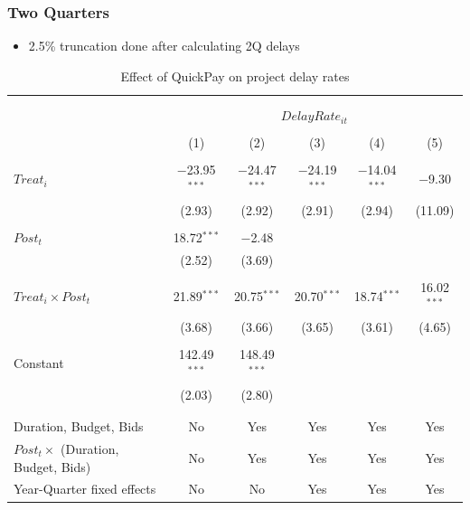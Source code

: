\documentclass[
]{article}
\providecommand{\tightlist}{%
  \setlength{\itemsep}{0pt}\setlength{\parskip}{0pt}}
\begin{document}
\hypertarget{two-quarters-5}{%
\subsubsection{Two Quarters}\label{two-quarters-5}}

\begin{itemize}
\tightlist
\item
  2.5\% truncation done after calculating 2Q delays
\end{itemize}

\begin{table}[H] \centering 
  \caption{Effect of QuickPay on project delay rates} 
  \label{} 
\small 
\begin{tabular}{@{\extracolsep{-2pt}}lccccc} 
\\[-1.8ex]\hline 
\hline \\[-1.8ex] 
\\[-1.8ex] & \multicolumn{5}{c}{$DelayRate_{it}$} \\ 
\\[-1.8ex] & (1) & (2) & (3) & (4) & (5)\\ 
\hline \\[-1.8ex] 
 $Treat_i$ & $-$23.95$^{***}$ & $-$24.47$^{***}$ & $-$24.19$^{***}$ & $-$14.04$^{***}$ & $-$9.30 \\ 
  & (2.93) & (2.92) & (2.91) & (2.94) & (11.09) \\ 
  & & & & & \\ 
 $Post_t$ & 18.72$^{***}$ & $-$2.48 &  &  &  \\ 
  & (2.52) & (3.69) &  &  &  \\ 
  & & & & & \\ 
 $Treat_i \times Post_t$ & 21.89$^{***}$ & 20.75$^{***}$ & 20.70$^{***}$ & 18.74$^{***}$ & 16.02$^{***}$ \\ 
  & (3.68) & (3.66) & (3.65) & (3.61) & (4.65) \\ 
  & & & & & \\ 
 Constant & 142.49$^{***}$ & 148.49$^{***}$ &  &  &  \\ 
  & (2.03) & (2.80) &  &  &  \\ 
  & & & & & \\ 
\hline \\[-1.8ex] 
Duration, Budget, Bids & No & Yes & Yes & Yes & Yes \\ 
$Post_t \times$  (Duration, Budget, Bids) & No & Yes & Yes & Yes & Yes \\ 
Year-Quarter fixed effects & No & No & Yes & Yes & Yes \\ 

\end{tabular}
\end{table}
\end{document}
